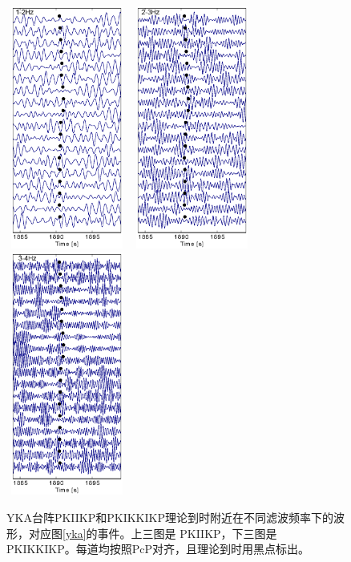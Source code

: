 \begin{figure}[!ht]
	\includegraphics[width=4cm,height=8cm]{fig/chap3/yka_e2_1_2.eps}
	\includegraphics[width=4cm,height=8cm]{fig/chap3/yka_e2_2_3.eps}
	\includegraphics[width=4cm,height=8cm]{fig/chap3/yka_e2_3_4.eps}
	\caption{YKA台阵PKIIKP和PKIKKIKP理论到时附近在不同滤波频率下的波形，对应图\ref{yka}的事件。上三图是%
PKIIKP，下三图是PKIKKIKP。每道均按照PcP对齐，且理论到时用黑点标出。}
	\label{yka_e1_e2}
\end{figure}

